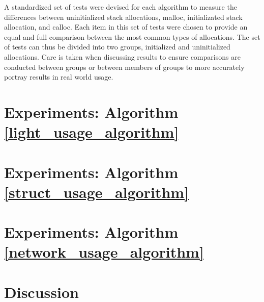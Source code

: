 \documentclass[letterpaper, 10 pt, conference]{ieeeconf}  %
\begin{document}
A standardized set of tests were devised for each algorithm to measure the differences between uninitialized stack allocations, malloc, initializated stack allocation, and calloc.
Each item in this set of tests were chosen to provide an equal and full comparison between the most common types of allocations.
The set of tests can thus be divided into two groups, initialized and uninitialized allocations.
Care is taken when discussing results to ensure comparisons are conducted between groups or between members of groups to more accurately portray results in real world usage. 



\section{Experiments: Algorithm \ref{light_usage_algorithm}}

\section{Experiments: Algorithm \ref{struct_usage_algorithm}}

\section{Experiments: Algorithm \ref{network_usage_algorithm}}

\section{Discussion}

\end{document}
